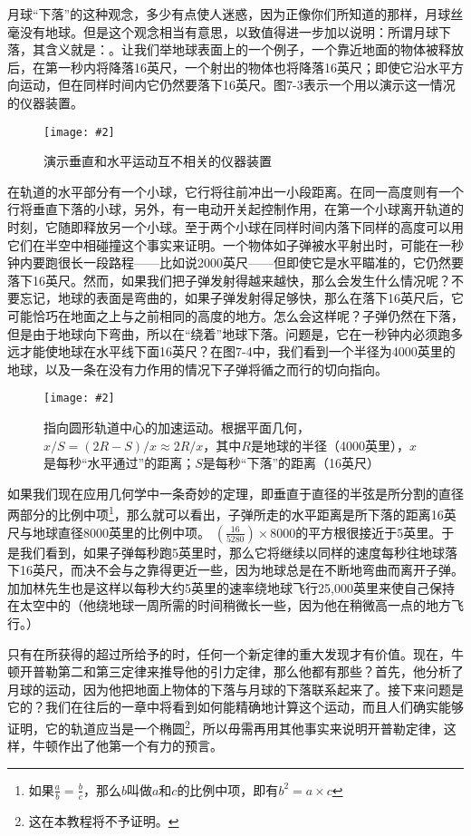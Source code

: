 \documentclass[12pt,oneside]{book}
\newenvironment{fig}[2][1]
{\begin{figure}[H]
\centering
\texttt{[image: \#2]}}
{\end{figure}}
\begin{document}
月球“下落”的这种观念，多少有点使人迷惑，因为正像你们所知道的那样，月球丝毫没有地球。但是这个观念相当有意思，以致值得进一步加以说明：所谓月球下落，其含义就是：。让我们举地球表面上的一个例子，一个靠近地面的物体被释放后，在第一秒内将降落16英尺，一个射出的物体也将降落16英尺；即使它沿水平方向运动，但在同样时间内它仍然要落下16英尺。图7-3表示一个用以演示这一情况的仪器装置。
\begin{fig}{演示垂直和水平运动互不相关的仪器装置}
\caption{\footnotesize 演示垂直和水平运动互不相关的仪器装置}
\label{fig:演示垂直和水平运动互不相关的仪器装置}
\end{fig}
在轨道的水平部分有一个小球，它行将往前冲出一小段距离。在同一高度则有一个行将垂直下落的小球，另外，有一电动开关起控制作用，在第一个小球离开轨道的时刻，它随即释放另一个小球。至于两个小球在同样时间内落下同样的高度可以用它们在半空中相碰撞这个事实来证明。一个物体如子弹被水平射出时，可能在一秒钟内要跑很长一段路程——比如说2000英尺——但即使它是水平瞄准的，它仍然要落下16英尺。然而，如果我们把子弹发射得越来越快，那么会发生什么情况呢？不要忘记，地球的表面是弯曲的，如果子弹发射得足够快，那么在落下16英尺后，它可能恰巧在地面之上与之前相同的高度的地方。怎么会这样呢？子弹仍然在下落，但是由于地球向下弯曲，所以在“绕着”地球下落。问题是，它在一秒钟内必须跑多远才能使地球在水平线下面16英尺？在图7-4中，我们看到一个半径为4000英里的地球，以及一条在没有力作用的情况下子弹将循之而行的切向指向。
\begin{fig}{指向圆形轨道中心的加速运动}
\caption{\footnotesize 指向圆形轨道中心的加速运动。根据平面几何，$x/S=(2R-S)/x\approx 2R/x$，其中$R$是地球的半径（4000英里），$x$是每秒“水平通过”的距离；$S$是每秒“下落”的距离（16英尺）}
\label{fig:指向圆形轨道中心的加速运动}
\end{fig}
如果我们现在应用几何学中一条奇妙的定理，即垂直于直径的半弦是所分割的直径两部分的比例中项\footnote{如果$\frac{a}{b}=\frac{b}{c}$，那么$b$叫做$a$和$c$的比例中项，即有$b^2=a \times c$}，那么就可以看出，子弹所走的水平距离是所下落的距离16英尺与地球直径8000英里的比例中项。
$(\frac{16}{5280})\times 8000$的平方根很接近于5英里。于是我们看到，如果子弹每秒跑5英里时，那么它将继续以同样的速度每秒往地球落下16英尺，而决不会与之靠得更近一些，因为地球总是在不断地弯曲而离开子弹。加加林先生也是这样以每秒大约5英里的速率绕地球飞行25,000英里来使自己保持在太空中的（他绕地球一周所需的时间稍微长一些，因为他在稍微高一点的地方飞行。）

只有在所获得的超过所给予的时，任何一个新定律的重大发现才有价值。现在，牛顿开普勒第二和第三定律来推导他的引力定律，那么他都有那些？首先，他分析了月球的运动，因为他把地面上物体的下落与月球的下落联系起来了。接下来问题是它的？我们在往后的一章中将看到如何能精确地计算这个运动，而且人们确实能够证明，它的轨道应当是一个椭圆\footnote{这在本教程将不予证明。}，所以毋需再用其他事实来说明开普勒定律，这样，牛顿作出了他第一个有力的预言。
\end{document}
